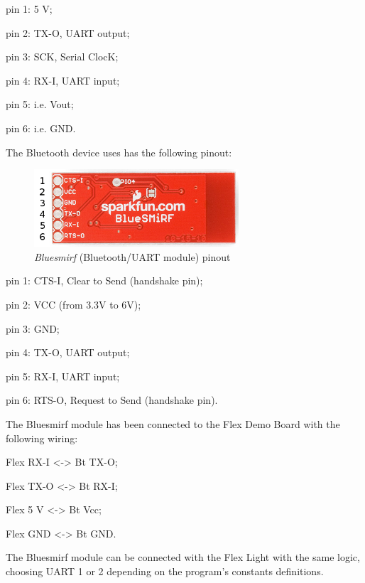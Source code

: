 \documentclass[twoside]{article}
\begin{document}
\begin{multicols}{2}
\begin{compactitem}
\item pin 1: 5 V;
\item pin 2: TX-O, UART output;
\item pin 3: SCK, Serial ClocK;
\item pin 4: RX-I, UART input;
\item pin 5: i.e. Vout;
\item pin 6: i.e. GND.
\end{compactitem}

The Bluetooth device uses has the following pinout:

\begin{figure}[H]
  \centering
  \includegraphics[width=3in]{img/bluesmirf_pinout}
  \caption{\textit{Bluesmirf} (Bluetooth/UART module) pinout}
\end{figure}

\begin{compactitem}
\item pin 1: CTS-I, Clear to Send (handshake pin);
\item pin 2: VCC (from 3.3V to 6V);
\item pin 3: GND;
\item pin 4: TX-O, UART output;
\item pin 5: RX-I, UART input;
\item pin 6: RTS-O, Request to Send (handshake pin).
\end{compactitem}

The Bluesmirf module has been connected to the Flex Demo Board with the following wiring:

\begin{compactitem}
\item Flex RX-I <-> Bt TX-O;
\item Flex TX-O <-> Bt RX-I;
\item Flex 5 V <-> Bt Vcc;
\item Flex GND <-> Bt GND.
\end{compactitem}

The Bluesmirf module can be connected with the Flex Light with the same logic, choosing UART 1 or 2 depending on the program's constants definitions.


\end{multicols}
\end{document}
